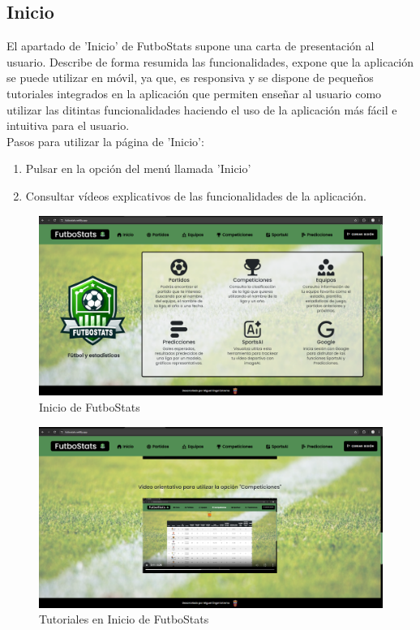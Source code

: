 \subsection{Inicio}
El apartado de 'Inicio' de FutboStats supone una carta de presentación al usuario. Describe de forma resumida las funcionalidades, expone que la aplicación se puede utilizar en móvil, ya que, es responsiva y se dispone de pequeños tutoriales integrados en la aplicación que permiten enseñar al usuario como utilizar las ditintas funcionalidades haciendo el uso de la aplicación más fácil e intuitiva para el usuario.\\
Pasos para utilizar la página de 'Inicio':
\begin{enumerate}
    \item Pulsar en la opción del menú llamada 'Inicio'
    \item Consultar vídeos explicativos de las funcionalidades de la aplicación.
\end{enumerate}

\begin{figure}[H]
    \centering
    \includegraphics[width=1\linewidth]{img/inicio-UM.png}
    \caption{Inicio de FutboStats}
    \label{fig:enter-label}
\end{figure}

\begin{figure}[H]
    \centering
    \includegraphics[width=1\linewidth]{img/inicio2-UM.png}
    \caption{Tutoriales en Inicio de FutboStats}
    \label{fig:enter-label}
\end{figure}

